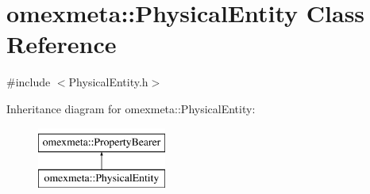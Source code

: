 \hypertarget{classomexmeta_1_1PhysicalEntity}{}\section{omexmeta\+:\+:Physical\+Entity Class Reference}
\label{classomexmeta_1_1PhysicalEntity}


{\ttfamily \#include $<$Physical\+Entity.\+h$>$}

Inheritance diagram for omexmeta\+:\+:Physical\+Entity\+:\begin{figure}[H]
\begin{center}
\leavevmode
\includegraphics[height=2.000000cm]{classomexmeta_1_1PhysicalEntity}
\end{center}
\end{figure}
